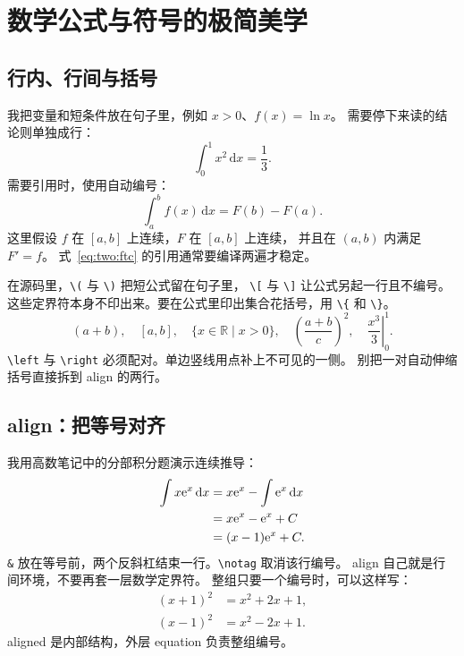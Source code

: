 \documentclass[UTF8,11pt,a4paper,oneside,openany,linespread=1]{ctexbook}
\numberwithin{equation}{chapter}
\begin{document}
\setcounter{chapter}{1}
\chapter{数学公式与符号的极简美学}

\section{行内、行间与括号}
我把变量和短条件放在句子里，例如 \(x>0\)、\(f(x)=\ln x\)。
需要停下来读的结论则单独成行：
\[
  \int_0^1x^2\,\mathrm{d}x=\frac13.
\]
需要引用时，使用自动编号：
\begin{equation}\label{eq:two:ftc}
  \int_a^b f(x)\,\mathrm{d}x=F(b)-F(a).
\end{equation}
这里假设 \(f\) 在 \([a,b]\) 上连续，\(F\) 在 \([a,b]\) 上连续，
并且在 \((a,b)\) 内满足 \(F'=f\)。
式~\eqref{eq:two:ftc} 的引用通常要编译两遍才稳定。

在源码里，\verb|\(| 与 \verb|\)| 把短公式留在句子里，
\verb|\[| 与 \verb|\]| 让公式另起一行且不编号。
这些定界符本身不印出来。要在公式里印出集合花括号，用 \verb|\{| 和 \verb|\}|。
\[
  (a+b),\quad [a,b],\quad \{x\in\mathbb R\mid x>0\},
  \quad \left(\frac{a+b}{c}\right)^2,
  \quad \left.\frac{x^3}{3}\right|_0^1.
\]
\verb|\left| 与 \verb|\right| 必须配对。单边竖线用点补上不可见的一侧。
别把一对自动伸缩括号直接拆到 align 的两行。

\section{align：把等号对齐}
我用高数笔记中的分部积分题演示连续推导：
\begin{align}
  \int x\mathrm{e}^x\,\mathrm{d}x
    &=x\mathrm{e}^x-\int\mathrm{e}^x\,\mathrm{d}x\notag\\
    &=x\mathrm{e}^x-\mathrm{e}^x+C\notag\\
    &=(x-1)\mathrm{e}^x+C.
\end{align}
\verb|&| 放在等号前，两个反斜杠结束一行。\verb|\notag| 取消该行编号。
align 自己就是行间环境，不要再套一层数学定界符。
整组只要一个编号时，可以这样写：
\begin{equation}
  \begin{aligned}
    (x+1)^2&=x^2+2x+1,\\
    (x-1)^2&=x^2-2x+1.
  \end{aligned}
\end{equation}
aligned 是内部结构，外层 equation 负责整组编号。
\end{document}
